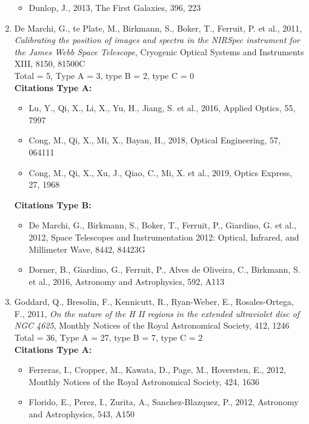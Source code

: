 \documentclass{letter}
\begin{document}
\begin{enumerate}
\begin{itemize}
\item Dunlop, J., 2013, The First Galaxies, 396, 223
\end{itemize}
\item De Marchi, G., te Plate, M., Birkmann, S., Boker, T., Ferruit, P. et al., 2011, {\it Calibrating the position of images and spectra in the NIRSpec instrument for the James Webb Space Telescope}, Cryogenic Optical Systems and Instruments XIII, 8150, 81500C \\ 
Total = 5, Type A = 3, type B = 2, type C = 0 \\ 
{\bf Citations Type A:}
\begin{itemize}
\item Lu, Y., Qi, X., Li, X., Yu, H., Jiang, S. et al., 2016, Applied Optics, 55, 7997
\item Cong, M., Qi, X., Mi, X., Bayan, H., 2018, Optical Engineering, 57, 064111
\item Cong, M., Qi, X., Xu, J., Qiao, C., Mi, X. et al., 2019, Optics Express, 27, 1968
\end{itemize}
{\bf Citations Type B:}
\begin{itemize}
\item De Marchi, G., Birkmann, S., Boker, T., Ferruit, P., Giardino, G. et al., 2012, Space Telescopes and Instrumentation 2012: Optical, Infrared, and Millimeter Wave, 8442, 84423G
\item Dorner, B., Giardino, G., Ferruit, P., Alves de Oliveira, C., Birkmann, S. et al., 2016, Astronomy and Astrophysics, 592, A113
\end{itemize}
\item Goddard, Q., Bresolin, F., Kennicutt, R., Ryan-Weber, E., Rosales-Ortega, F., 2011, {\it On the nature of the H II regions in the extended ultraviolet disc of NGC 4625}, Monthly Notices of the Royal Astronomical Society, 412, 1246 \\ 
Total = 36, Type A = 27, type B = 7, type C = 2 \\ 
{\bf Citations Type A:}
\begin{itemize}
\item Ferreras, I., Cropper, M., Kawata, D., Page, M., Hoversten, E., 2012, Monthly Notices of the Royal Astronomical Society, 424, 1636
\item Florido, E., Perez, I., Zurita, A., Sanchez-Blazquez, P., 2012, Astronomy and Astrophysics, 543, A150

\end{itemize}
\end{enumerate}
\end{document}

